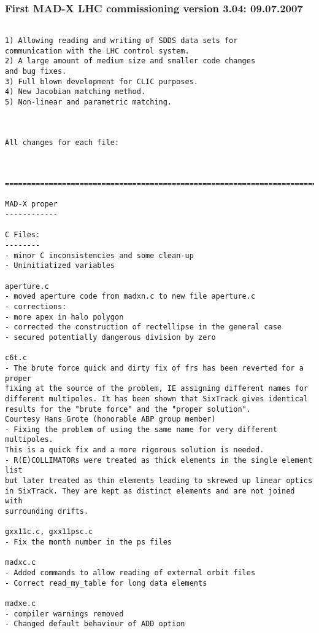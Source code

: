 \subsubsection{First MAD-X LHC commissioning version 3.04: 09.07.2007}
\begin{verbatim}

1) Allowing reading and writing of SDDS data sets for
communication with the LHC control system.
2) A large amount of medium size and smaller code changes
and bug fixes.
3) Full blown development for CLIC purposes.
4) New Jacobian matching method.
5) Non-linear and parametric matching.



All changes for each file:



=============================================================================

MAD-X proper
------------

C Files:
--------
- minor C inconsistencies and some clean-up
- Uninitiatized variables

aperture.c
- moved aperture code from madxn.c to new file aperture.c
- corrections:
- more apex in halo polygon
- corrected the construction of rectellipse in the general case
- secured potentially dangerous division by zero

c6t.c
- The brute force quick and dirty fix of frs has been reverted for a proper
fixing at the source of the problem, IE assigning different names for
different multipoles. It has been shown that SixTrack gives identical
results for the "brute force" and the "proper solution".
Courtesy Hans Grote (honorable ABP group member)
- Fixing the problem of using the same name for very different multipoles.
This is a quick fix and a more rigorous solution is needed.
- R(E)COLLIMATORs were treated as thick elements in the single element list
but later treated as thin elements leading to skrewed up linear optics
in SixTrack. They are kept as distinct elements and are not joined with
surrounding drifts.

gxx11c.c, gxx11psc.c
- Fix the month number in the ps files

madxc.c
- Added commands to allow reading of external orbit files
- Correct read_my_table for long data elements

madxe.c
- compiler warnings removed
- Changed default behaviour of ADD option


\end{verbatim}

